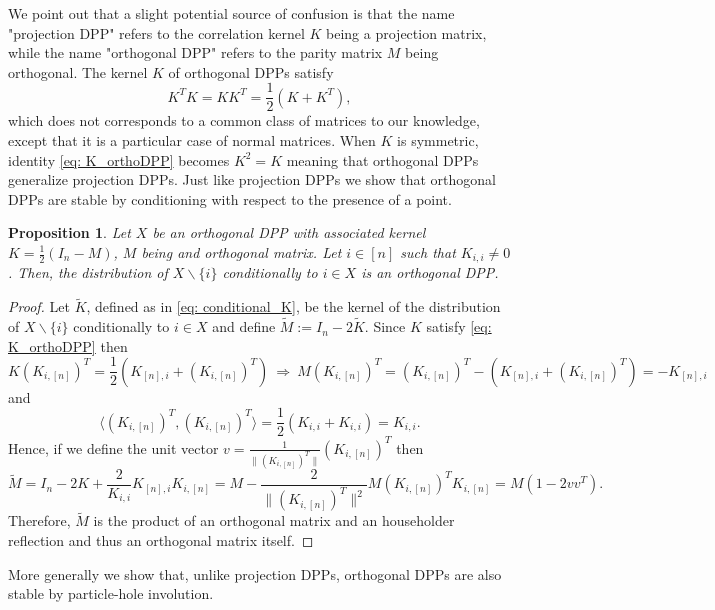 \documentclass{article}
\numberwithin{equation}{section}
\renewcommand{\tilde}{\widetilde}
\newcommand{\defeq}{:=}
\theoremstyle{plain}
\newtheorem{proposition}{Proposition}[section]
\begin{document}
We point out that a slight potential source of confusion is that the name "projection DPP" refers to the correlation kernel $K$ being a projection matrix, while the name "orthogonal DPP" refers to the parity matrix $M$ being orthogonal. The kernel $K$ of orthogonal DPPs satisfy
\begin{equation}\label{eq: K_orthoDPP}
K^TK = KK^T = \frac{1}{2}(K + K^T),
\end{equation}
which does not corresponds to a common class of matrices to our knowledge, except that it is a particular case of normal matrices. When $K$ is symmetric, identity \eqref{eq: K_orthoDPP} becomes $K^2=K$ meaning that orthogonal DPPs generalize projection DPPs. Just like projection DPPs we show that orthogonal DPPs are stable by conditioning with respect to the presence of a point.

\begin{proposition}
Let $X$ be an orthogonal DPP with associated kernel $K=\frac{1}{2}(I_n - M)$, $M$ being and orthogonal matrix. Let $i\in [n]$ such that $K_{i,i}\neq 0$. Then, the distribution of $X\backslash \{i\}$ conditionally to $i\in X$ is an orthogonal DPP.
\end{proposition}
\begin{proof}
Let $\tilde K$, defined as in \eqref{eq: conditional_K}, be the kernel of the distribution of $X\backslash \{i\}$ conditionally to $i\in X$ and define $\tilde M\defeq I_n - 2\tilde K$. Since $K$ satisfy \eqref{eq: K_orthoDPP} then
\[K(K_{i, [n]})^T=\frac{1}{2}(K_{[n], i}+(K_{i, [n]})^T)~\Rightarrow~M(K_{i, [n]})^T=(K_{i, [n]})^T-(K_{[n], i}+(K_{i, [n]})^T)=-K_{[n], i}\]
and
\[\langle (K_{i, [n]})^T, (K_{i, [n]})^T\rangle=\frac{1}{2}(K_{i,i}+K_{i,i})=K_{i, i}.\]
Hence, if we define the unit vector $v=\frac{1}{\|(K_{i, [n]})^T\|}(K_{i, [n]})^T$ then
\[\tilde M = I_n - 2K + \frac{2}{K_{i,i}}K_{[n], i}K_{i, [n]}=M - \frac{2}{\|(K_{i, [n]})^T\|^2}M(K_{i, [n]})^TK_{i, [n]}=M(1-2vv^T).\]
Therefore, $\tilde M$ is the product of an orthogonal matrix and an householder reflection and thus an orthogonal matrix itself.
\end{proof}

\noindent More generally we show that, unlike projection DPPs, orthogonal DPPs are also stable by particle-hole involution.
\end{document}
